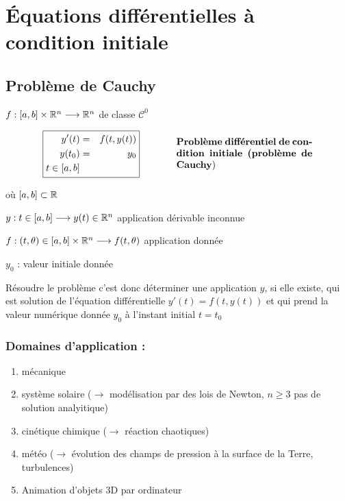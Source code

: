 \chapter{Équations différentielles à condition initiale}

\section{Problème de Cauchy}

$f : [a,b] \times \mathbb{R}^n \longrightarrow \mathbb{R}^n$ de classe $\mathcal{C}^0$

\begin{equation*}
    \begin{array}{cc}
        \boxed{\begin{aligned}
            y'(t)  & = & f(t,y(t)) \\
            y(t_0) & = & y_0 \\
            t \in [a,b]
        \end{aligned}}
        & \hspace{1cm}
        \parbox{5cm}{\textbf{Problème différentiel de condition initiale (problème de Cauchy})}
    \end{array}
\end{equation*}

où $[a,b] \subset \mathbb{R}$

\hspace{0.5cm} $y : t \in [a,b] \longrightarrow y(t) \in \mathbb{R}^n$ application dérivable inconnue

\hspace{0.5cm} $f : (t, \theta) \in [a,b] \times \mathbb{R}^n \longrightarrow f(t,\theta)$ application donnée

\hspace{0.5cm} $y_0$ : valeur initiale donnée


Résoudre le problème c'est donc déterminer une application $y$, si elle existe, qui est solution de 
l'équation différentielle $y'(t) = f(t,y(t))$ et qui prend la valeur numérique donnée 
$y_0$ à l'instant initial $t=t_0$

\subsection*{Domaines d'application :}
\begin{enumerate}[label=-]
    \item mécanique
    \item système solaire ($\to$ modélisation par des lois de Newton, $n \geq 3$ pas de solution analyitique)
    \item cinétique chimique ($\to$ réaction chaotiques)
    \item météo ($\to$ évolution des champs de pression à la surface de la Terre, turbulences)
    \item Animation d'objets 3D par ordinateur
\end{enumerate}

